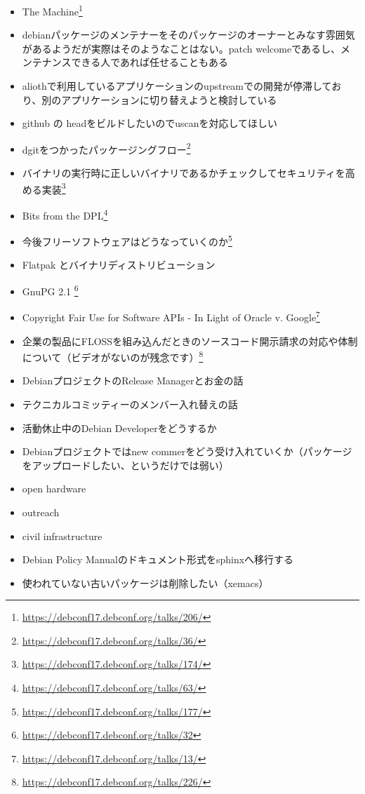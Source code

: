 \documentclass[mingoth,a4paper]{jsarticle}
\begin{document}
\begin{itemize}
\item The Machine\footnote{\url{https://debconf17.debconf.org/talks/206/}}
\item debianパッケージのメンテナーをそのパッケージのオーナーとみなす雰囲気があるようだが実際はそのようなことはない。patch welcomeであるし、メンテナンスできる人であれば任せることもある
\item aliothで利用しているアプリケーションのupstreamでの開発が停滞しており、別のアプリケーションに切り替えようと検討している
\item github の headをビルドしたいのでuscanを対応してほしい
\item dgitをつかったパッケージングフロー\footnote{\url{https://debconf17.debconf.org/talks/36/}}
\item バイナリの実行時に正しいバイナリであるかチェックしてセキュリティを高める実装\footnote{\url{https://debconf17.debconf.org/talks/174/}}
\item Bits from the DPL\footnote{\url{https://debconf17.debconf.org/talks/63/}}
\item 今後フリーソフトウェアはどうなっていくのか\footnote{\url{https://debconf17.debconf.org/talks/177/}}
\item Flatpak とバイナリディストリビューション
\item GnuPG 2.1 \footnote{\url{https://debconf17.debconf.org/talks/32}}
\item Copyright Fair Use for Software APIs - In Light of Oracle v. Google\footnote{\url{https://debconf17.debconf.org/talks/13/}}
\item 企業の製品にFLOSSを組み込んだときのソースコード開示請求の対応や体制について（ビデオがないのが残念です）\footnote{\url{https://debconf17.debconf.org/talks/226/}}
\item DebianプロジェクトのRelease Managerとお金の話
\item テクニカルコミッティーのメンバー入れ替えの話
\item 活動休止中のDebian Developerをどうするか
\item Debianプロジェクトではnew commerをどう受け入れていくか（パッケージをアップロードしたい、というだけでは弱い）
\item open hardware
\item outreach
\item civil infrastructure
\item Debian Policy Manualのドキュメント形式をsphinxへ移行する
\item 使われていない古いパッケージは削除したい（xemacs）
\end{itemize}
\end{document}
